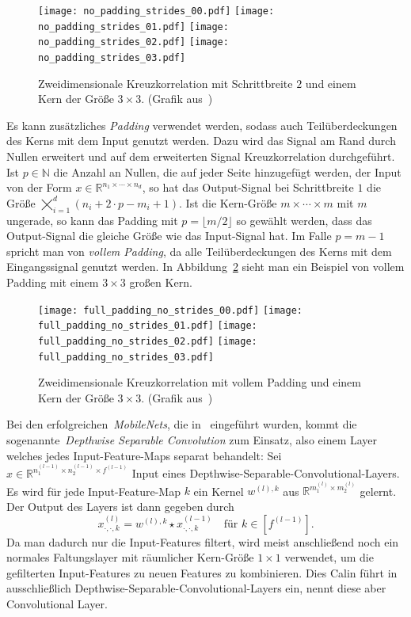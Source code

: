 \documentclass[paper=a4, 	%
		fontsize=11pt,
		abstract=true, 	%
		headsepline, 	%
		notitlepage	%
		]{scrartcl}
\theoremstyle{definition}
\newcommand{\R}{\mathbb{R}}
\newcommand{\N}{\mathbb{N}}
\newcommand{\bcdot}{\boldsymbol{\cdot}}
\newcommand{\fNat}[1]{[ #1 ]}
\begin{document}
\begin{figure}[ht]
    \centering
    \texttt{[image: no\_padding\_strides\_00.pdf]}
    \texttt{[image: no\_padding\_strides\_01.pdf]}
    \texttt{[image: no\_padding\_strides\_02.pdf]}
    \texttt{[image: no\_padding\_strides\_03.pdf]}
    \caption{Zweidimensionale Kreuzkorrelation mit Schrittbreite $2$ und einem Kern der Größe $3\times 3$. {\scriptsize (Grafik aus~\cite{dumoulin2016guide})}}
    \label{fig:cross-corr-with-stride}
\end{figure}

Es kann zusätzliches \emph{Padding} verwendet werden, sodass auch Teilüberdeckungen des Kerns mit dem Input genutzt werden.
Dazu wird das Signal am Rand durch Nullen erweitert und auf dem erweiterten Signal Kreuzkorrelation durchgeführt.
Ist $p\in\N$ die Anzahl an Nullen, die auf jeder Seite hinzugefügt werden, der Input von der Form $x\in\R^{n_1\times\cdots\times n_d}$, so hat das Output-Signal bei Schrittbreite $1$ die Größe $\bigtimes_{i=1}^d (n_i + 2\cdot p - m_i + 1)$.
Ist die Kern-Größe $m\times\cdots\times m$ mit $m$ ungerade, so kann das Padding mit $p=\lfloor m/2 \rfloor$ so gewählt werden, dass das Output-Signal die gleiche Größe wie das Input-Signal hat.
Im Falle $p=m-1$ spricht man von \emph{vollem Padding}, da alle Teilüberdeckungen des Kerns mit dem Eingangssignal genutzt werden.
In Abbildung~\ref{fig:cross-corr-with-padding} sieht man ein Beispiel von vollem Padding mit einem $3\times 3$ großen Kern.


\begin{figure}[ht]
    \centering
    \texttt{[image: full\_padding\_no\_strides\_00.pdf]}
    \texttt{[image: full\_padding\_no\_strides\_01.pdf]}
    \texttt{[image: full\_padding\_no\_strides\_02.pdf]}
    \texttt{[image: full\_padding\_no\_strides\_03.pdf]}
    \caption{Zweidimensionale Kreuzkorrelation mit vollem Padding und einem Kern der Größe $3\times 3$. {\scriptsize (Grafik aus~\cite{dumoulin2016guide})}}
    \label{fig:cross-corr-with-padding}
\end{figure}


Bei den erfolgreichen~\emph{MobileNets}, die in~\cite{DBLP:journals/corr/HowardZCKWWAA17} eingeführt wurden, kommt die sogenannte~\emph{\foreignlanguage{english}{Depthwise Separable Convolution}} zum Einsatz, also einem Layer welches jedes Input-Feature-Maps separat behandelt:
Sei $x\in\R^{n_1^{(l-1)}\times n_2^{(l-1)}\times f^{(l-1)}}$ Input eines Depthwise-Separable-Convolutional-Layers.
Es wird für jede Input-Feature-Map $k$ ein Kernel $w^{(l),k}$ aus $\R^{m_1^{(l)}\times m_2^{(l)}}$ gelernt.
Der Output des Layers ist dann gegeben durch
\[
    x^{(l)}_{\bcdot,\bcdot,k} = w^{(l),k} \star x^{(l-1)}_{\bcdot,\bcdot, k} \quad \text{für $k\in\fNat{f^{(l-1)}}$}.
\]
Da man dadurch nur die Input-Features filtert, wird meist anschließend noch ein normales Faltungslayer mit räumlicher Kern-Größe $1\times 1$ verwendet, um die gefilterten Input-Features zu neuen Features zu kombinieren.
Dies 
Calin führt in~\cite[Abschnitt~16.5]{Calin2020} ausschließlich Depthwise-Separable-Convolutional-Layers ein, nennt diese aber \glqq Convolutional Layer\grqq.
\end{document}
